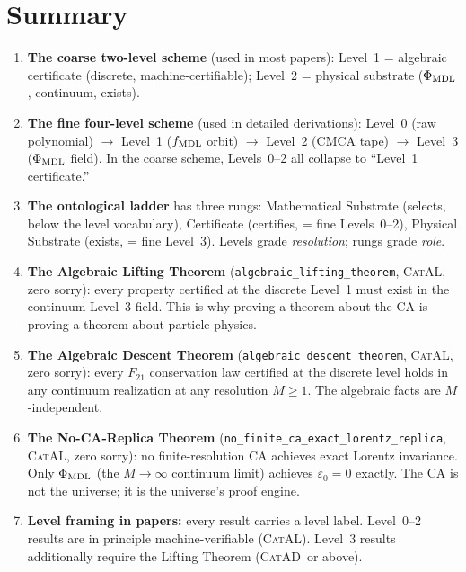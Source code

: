 \documentclass[11pt,a4paper]{article}
\newcommand{\lean}[1]{\texttt{#1}}
\newcommand{\PhiMDL}{\Phi_{\rm MDL}}
\newcommand{\fMDL}{f_{\rm MDL}}
\newcommand{\CatAL}{\textsc{CatAL}}
\newcommand{\CatAD}{\textsc{CatAD}}
\begin{document}
\section{Summary}
\label{sec:summary}

\begin{tcolorbox}[colback=boxblue,colframe=blue!40!black,
  title=The key things to remember]
\begin{enumerate}[itemsep=8pt]
  \item \textbf{The coarse two-level scheme} (used in most papers):
    Level~1 = algebraic certificate (discrete, machine-certifiable);
    Level~2 = physical substrate ($\PhiMDL$, continuum, exists).

  \item \textbf{The fine four-level scheme} (used in detailed derivations):
    Level~0 (raw polynomial) $\to$ Level~1 ($\fMDL$ orbit)
    $\to$ Level~2 (CMCA tape) $\to$ Level~3 ($\PhiMDL$ field).
    In the coarse scheme, Levels~0--2 all collapse to ``Level~1 certificate.''

  \item \textbf{The ontological ladder} has three rungs:
    Mathematical Substrate (selects, below the level vocabulary),
    Certificate (certifies, = fine Levels~0--2),
    Physical Substrate (exists, = fine Level~3).
    Levels grade \emph{resolution}; rungs grade \emph{role}.

  \item \textbf{The Algebraic Lifting Theorem}
    (\lean{algebraic\_lifting\_theorem}, \CatAL, zero sorry):
    every property certified at the discrete Level~1 must exist in the
    continuum Level~3 field.
    This is why proving a theorem about the CA is proving a theorem
    about particle physics.

  \item \textbf{The Algebraic Descent Theorem}
    (\lean{algebraic\_descent\_theorem}, \CatAL, zero sorry):
    every $F_{21}$ conservation law certified at the discrete level
    holds in any continuum realization at any resolution $M \geq 1$.
    The algebraic facts are $M$-independent.

  \item \textbf{The No-CA-Replica Theorem}
    (\lean{no\_finite\_ca\_exact\_lorentz\_replica}, \CatAL, zero sorry):
    no finite-resolution CA achieves exact Lorentz invariance.
    Only $\PhiMDL$ (the $M \to \infty$ continuum limit) achieves
    $\varepsilon_0 = 0$ exactly.
    The CA is not the universe; it is the universe's proof engine.

  \item \textbf{Level framing in papers:} every result carries a level label.
    Level~0--2 results are in principle machine-verifiable (\CatAL).
    Level~3 results additionally require the Lifting Theorem (\CatAD\ or above).
\end{enumerate}
\end{tcolorbox}
\end{document}
